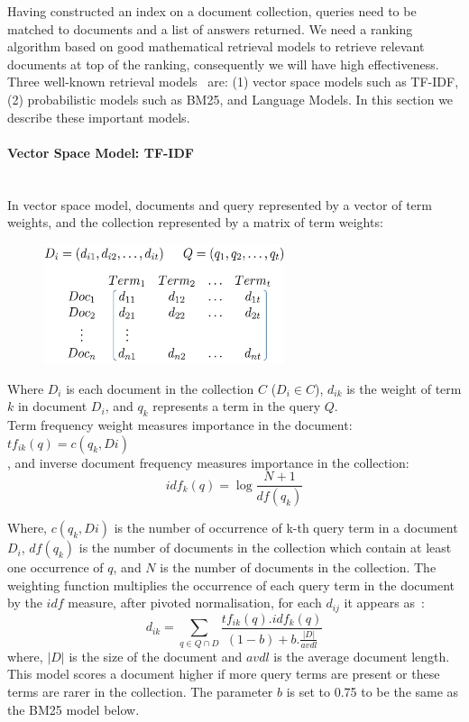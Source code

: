 Having constructed an index on a document collection, queries need to 
be matched to documents and a list of answers returned. We need a ranking algorithm based on good mathematical retrieval models to 
retrieve relevant documents at top of the ranking, consequently we will have high effectiveness. 
Three well-known retrieval models~\citep{croft2010search} are: (1) vector space models such as TF-IDF, (2) probabilistic models such as BM25, and Language Models. In this section we describe these important models.   

\paragraph{Vector Space Model: TF-IDF}
\ \\
In vector space model, documents and query represented by a vector of term weights, and the collection represented by a matrix of term weights: 
\capstartfalse
\begin{figure}[htpb]
   \centering
   \includegraphics[width=.45\textwidth,height=35mm]{figs/vsm-matrix.jpg}
\end{figure}
\capstarttrue
\FloatBarrier 

Where $ D_{i} $ is each document in the collection $ C $ ($ D_{i}\in C $), $ d_{ik} $ is the weight of term $ k $ in document $ D_{i} $, and $ q_{k} $ represents a term in the query $ Q $.\\
Term frequency weight measures importance in the document: \,\,\,
$ tf_{ik}(q)=c(q_{k},Di)$ 
\\, and inverse document frequency measures importance in the collection:\,\,\,\,\,\, 
\begin{equation}
idf_{k}(q)=\log\frac{N+1}{df(q_{k})}
\label{eq:idf}
\end{equation}

Where, $ c(q_{k},Di) $ is the number of occurrence of k-th query term in a document $ D_{i} $, $ df(q_{k}) $ is the number of documents in the collection which contain at least one occurrence of $ q $, and $ N $ is the number of documents in the collection. The weighting function multiplies the occurrence of each query term in the document
by the $ idf $ measure, after pivoted normalisation, for each $ d_{ij} $ it appears as~\citep{bache2010improving}:
\begin{equation}
d_{ik}=\sum\limits_{q \in Q\cap D}\frac{tf_{ik}(q).idf_{k}(q)}{(1-b)+b.\frac{|D|}{avdl}}
\label{eq:tfidf}
\end{equation}
where, $ |D| $ is the size of the document and $ avdl $ is the average document length. This model scores a document higher if more query terms are present or these terms are rarer in the collection. The parameter $ b $ is set to 0.75 to be the same as the BM25 model below.

